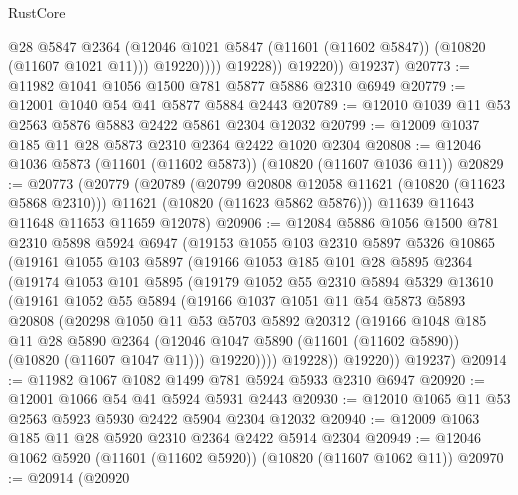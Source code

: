 \begin{lexlean}{RustCore}
\begin{coremodule}
                      @28
                      @5847
                      @2364
                      (@12046 @1021 @5847 (@11601 (@11602 @5847)) (@10820 (@11607 @1021 @11)))
                      @19220))))
              @19228))
          @19220))
      @19237)
@20773 := @11982 @1041 @1056 @1500 @781 @5877 @5886 @2310 @6949
@20779 := @12001 @1040 @54 @41 @5877 @5884 @2443
@20789 := @12010 @1039 @11 @53 @2563 @5876 @5883 @2422 @5861 @2304 @12032
@20799 := @12009 @1037 @185 @11 @28 @5873 @2310 @2364 @2422 @1020 @2304
@20808 := @12046 @1036 @5873 (@11601 (@11602 @5873)) (@10820 (@11607 @1036 @11))
@20829 := @20773
    (@20779
      (@20789
        (@20799 @20808 @12058 @11621 (@10820 (@11623 @5868 @2310)))
        @11621
        (@10820 (@11623 @5862 @5876)))
      @11639
      @11643
      @11648
      @11653
      @11659
      @12078)
@20906 := @12084
    @5886
    @1056
    @1500
    @781
    @2310
    @5898
    @5924
    @6947
    (@19153
      @1055
      @103
      @2310
      @5897
      @5326
      @10865
      (@19161
        @1055
        @103
        @5897
        (@19166
          @1053
          @185
          @101
          @28
          @5895
          @2364
          (@19174
            @1053
            @101
            @5895
            (@19179
              @1052
              @55
              @2310
              @5894
              @5329
              @13610
              (@19161
                @1052
                @55
                @5894
                (@19166
                  @1037
                  @1051
                  @11
                  @54
                  @5873
                  @5893
                  @20808
                  (@20298
                    @1050
                    @11
                    @53
                    @5703
                    @5892
                    @20312
                    (@19166
                      @1048
                      @185
                      @11
                      @28
                      @5890
                      @2364
                      (@12046 @1047 @5890 (@11601 (@11602 @5890)) (@10820 (@11607 @1047 @11)))
                      @19220))))
              @19228))
          @19220))
      @19237)
@20914 := @11982 @1067 @1082 @1499 @781 @5924 @5933 @2310 @6947
@20920 := @12001 @1066 @54 @41 @5924 @5931 @2443
@20930 := @12010 @1065 @11 @53 @2563 @5923 @5930 @2422 @5904 @2304 @12032
@20940 := @12009 @1063 @185 @11 @28 @5920 @2310 @2364 @2422 @5914 @2304
@20949 := @12046 @1062 @5920 (@11601 (@11602 @5920)) (@10820 (@11607 @1062 @11))
@20970 := @20914
    (@20920

\end{coremodule}
\end{lexlean}
